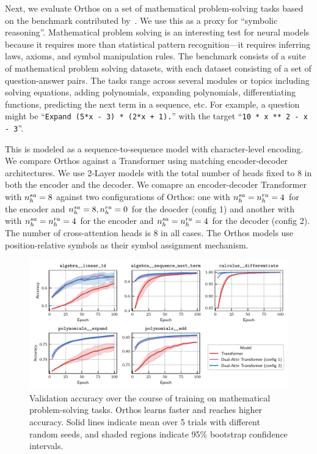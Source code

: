 Next, we evaluate Orthos on a set of mathematical problem-solving tasks based on the benchmark contributed by~\citet{saxtonAnalyzingMathematicalReasoning2019}. We use this as a proxy for ``symbolic reasoning''. Mathematical problem solving is an interesting test for neural models because it requires more than statistical pattern recognition---it requires inferring laws, axioms, and symbol manipulation rules. The benchmark consists of a suite of mathematical problem solving datasets, with each dataset consisting of a set of question-answer pairs. The tasks range across several modules or topics including solving equations, adding polynomials, expanding polynomials, differentiating functions, predicting the next term in a sequence, etc. For example, a question might be ``\texttt{Expand (5*x - 3) * (2*x + 1).}'' with the target ``\texttt{10 * x ** 2 - x - 3}''.

This is modeled as a sequence-to-sequence model with character-level encoding. We compare Orthos against a Transformer using matching encoder-decoder architectures. We use 2-Layer models with the total number of heads fixed to $8$ in both the encoder and the decoder. We comapre an encoder-decoder Transformer with $n_h^{sa} = 8$ against two configurations of Orthos: one with $n_h^{sa} = n_h^{ra} = 4$ for the encoder and $n_h^{sa} = 8, n_h^{ra} = 0$ for the deocder (config 1) and another with with $n_h^{sa} = n_h^{ra} = 4$ for the encoder and $n_h^{sa} = n_h^{ra} = 4$ for the decoder (config 2). The number of cross-attention heads is $8$ in all cases. The Orthos models use position-relative symbols as their symbol assignment mechanism.

\begin{figure}
    \includegraphics[width=\textwidth]{figs/experiments/math/math_training_curves_interpolation.pdf}
    \caption{Validation accuracy over the course of training on mathematical problem-solving tasks. Orthos learns faster and reaches higher accuracy. Solid lines indicate mean over 5 trials with different random seeds, and shaded regions indicate 95\% bootstrap confidence intervals.}\label{fig:math_training_curves_interpolation}
\end{figure}


